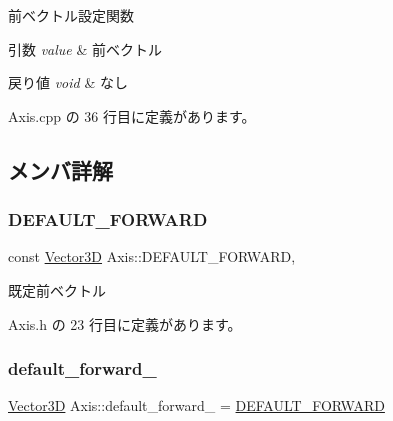 前ベクトル設定関数 


\begin{DoxyParams}{引数}
{\em value} & 前ベクトル \\
\hline
\end{DoxyParams}

\begin{DoxyRetVals}{戻り値}
{\em void} & なし \\
\hline
\end{DoxyRetVals}


 Axis.\+cpp の 36 行目に定義があります。



\subsection{メンバ詳解}
\mbox{\label{class_axis_a3360259f8662e72e5d86405647dc0188}} 
\subsubsection{\texorpdfstring{D\+E\+F\+A\+U\+L\+T\+\_\+\+F\+O\+R\+W\+A\+RD}{DEFAULT\_FORWARD}}
{\footnotesize\ttfamily const \mbox{\hyperlink{class_vector3_d}{Vector3D}} Axis\+::\+D\+E\+F\+A\+U\+L\+T\+\_\+\+F\+O\+R\+W\+A\+RD\hspace{0.3cm}{\ttfamily [static]}, {\ttfamily [private]}}



既定前ベクトル 



 Axis.\+h の 23 行目に定義があります。

\mbox{\label{class_axis_a7588c9e81446f5b2c69af24a11763309}} 
\subsubsection{\texorpdfstring{default\+\_\+forward\+\_\+}{default\_forward\_}}
{\footnotesize\ttfamily \mbox{\hyperlink{class_vector3_d}{Vector3D}} Axis\+::default\+\_\+forward\+\_\+ = \mbox{\hyperlink{class_axis_a3360259f8662e72e5d86405647dc0188}{D\+E\+F\+A\+U\+L\+T\+\_\+\+F\+O\+R\+W\+A\+RD}}\hspace{0.3cm}{\ttfamily [private]}}



